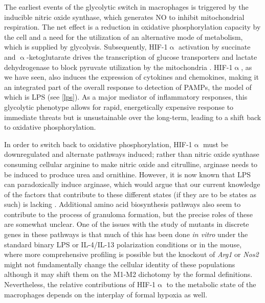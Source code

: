 The earliest events of the glycolytic switch in macrophages is triggered by the inducible nitric oxide synthase, which generates NO to inhibit mitochondrial respiration. The net effect is a reduction in oxidative phosphorylation capacity by the cell and a need for the utilization of an alternative mode of metabolism, which is supplied by glycolysis. Subsequently, HIF-1$\upalpha$ activation by succinate and $\upalpha$-ketoglutarate drives the transcription of glucose transporters and lactate dehydrogenase to block pyruvate utilization by the mitochondria \citep{Russell2019}. HIF-1$\upalpha$, as we have seen, also induces the expression of cytokines and chemokines, making it an integrated part of the overall response to detection of PAMPs, the model of which is LPS (see \autoref{lps}). As a major mediator of inflammatory responses, this glycolytic phenotype allows for rapid, energetically expensive response to immediate threats but is unsustainable over the long-term, leading to a shift back to oxidative phosphorylation.

In order to switch back to oxidative phosphorylation, HIF-1$\upalpha$ must be downregulated and alternate pathways induced; rather than nitric oxide synthase consuming cellular arginine to make nitric oxide and citrulline, arginase needs to be induced to produce urea and ornithine. However, it is now known that LPS can paradoxically induce arginase, which would argue that our current knowledge of the factors that contribute to these different states (if they are to be states as such) is lacking \citep{ElKasmi2008}. Additional amino acid biosynthesis pathways also seem to contribute to the process of granuloma formation, but the precise roles of these are somewhat unclear. One of the issues with the study of mutants in discrete genes in these pathways is that much of this has been done \textit{in vitro} under the standard binary LPS or IL-4/IL-13 polarization conditions or in the mouse, where more comprehensive profiling is possible but the knockout of \textit{Arg1} or \textit{Nos2} might not fundamentally change the cellular identity of these populations although it may shift them on the M1-M2 dichotomy by the formal definitions. Nevertheless, the relative contributions of HIF-1$\upalpha$ to the metabolic state of the macrophages depends on the interplay of formal hypoxia as well. 

